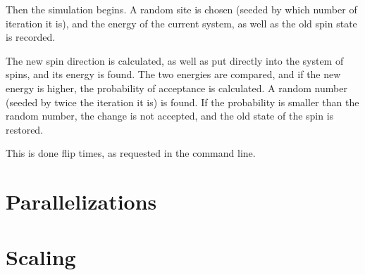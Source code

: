 \documentclass{article}
\begin{document}
Then the simulation begins. A random site is chosen (seeded by which number of iteration it is), and the energy of the current system, as well as the old spin state is recorded. 

The new spin direction is calculated, as well as put directly into the system of spins, and its energy is found. The two energies are compared, and if the new energy is higher, the probability of acceptance is calculated. A random number (seeded by twice the iteration it is) is found. If the probability is smaller than the random number, the change is not accepted, and the old state of the spin is restored.

This is done flip times, as requested in the command line.

\section{Parallelizations}

\section{Scaling}

\printbibliography
\end{document}
